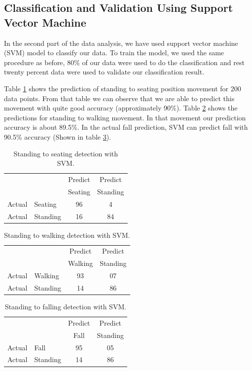 \documentclass{llncs}
\begin{document}
\begin{sloppy}
\subsection{Classification and Validation Using Support Vector Machine}

In the second part of the data analysis, we have used support vector machine (SVM) model
to classify our data. To train the model, we used the same procedure as before, 80\% of
our data were used to do the classification and rest twenty percent data were used to validate our
classification result.

Table \ref{tab:StandingToSeatingDetectionsvm} shows the prediction of standing to seating position
movement for 200 data points. From that table we can observe that we are able to predict this
movement with quite good accuracy (approximately 90\%). Table
\ref{tab:StandingToWalkingDetectionsvm} shows the predictions for standing to
walking movement. In that movement our prediction accuracy is about 89.5\%. In the actual fall
prediction, SVM can predict fall with 90.5\% accuracy (Shown in table
\ref{tab:StandingToFallingDetectionsvm}).
\vspace{-5mm}
\begin{table}[!h]
\caption{Standing to seating detection with SVM.}
	\label{tab:StandingToSeatingDetectionsvm}
	\centering
		\begin{tabular} {l l |c |c}
			& & Predict& Predict \\ 
			& & Seating & Standing \\ \hline
			Actual& Seating & 96 & 4\\ \hline
			Actual& Standing & 16& 84\\ \hline
		\end{tabular}
\end{table}
\vspace{-10mm}
\begin{table}[!h]
	\caption{Standing to walking detection with SVM.}
	\label{tab:StandingToWalkingDetectionsvm}
	\centering
		\begin{tabular} {l l |c |c}
			& & Predict& Predict \\ 
			& & Walking & Standing \\ \hline
			Actual& Walking & 93 & 07\\ \hline
			Actual& Standing & 14& 86\\ \hline
		\end{tabular}
\end{table}
\vspace{-10mm}
\begin{table}[!h]
	\caption{Standing to falling detection with SVM.}
	\label{tab:StandingToFallingDetectionsvm}
	\centering
		\begin{tabular} {l l |c |c}
			& & Predict& Predict \\ 
			& & Fall & Standing \\ \hline
			Actual& Fall & 95 & 05\\ \hline
			Actual& Standing & 14& 86\\ \hline
		\end{tabular}
\end{table}
\vspace{-5mm}

\end{sloppy}
\end{document}
